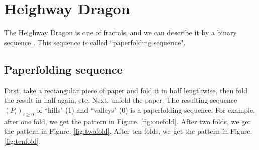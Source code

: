 \documentclass[runningheads,a4]{llncs}
\begin{document}
\section{Heighway Dragon}

The Heighway Dragon is one of fractals, and we can describe it by a binary sequence \cite{automatic}.
This sequence is called ``paperfolding sequence".

\subsection{Paperfolding sequence}
First, take a rectangular piece of paper and fold it in half lengthwise, then fold the result in half again, etc.
Next, unfold the paper.
The resulting sequence $(P_i)_{i\geq0}$ of ``hills" (1) and ``valleys" (0) is a paperfolding sequence.
For example,  after one fold, we get the pattern in Figure. \ref{fig:onefold}.
After two folds, we get the pattern in Figure. \ref{fig:twofold}.
After ten folds, we get the pattern in Figure. \ref{fig:tenfold}.
\end{document}
